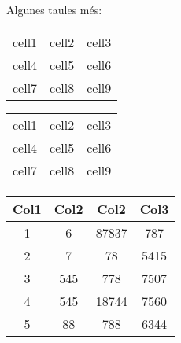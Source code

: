 %
%
%
Algunes taules més:
%
\begin{center}
\begin{tabular}{ c c c }
 cell1 & cell2 & cell3 \\ 
 cell4 & cell5 & cell6 \\  
 cell7 & cell8 & cell9    
\end{tabular}
\end{center}
%
\begin{center}
\begin{tabular}{ |c|c|c| } 
 \hline
 cell1 & cell2 & cell3 \\ 
 cell4 & cell5 & cell6 \\ 
 cell7 & cell8 & cell9 \\ 
 \hline
\end{tabular}
\end{center}

\begin{center}
 \begin{tabular}{||c c c c||} 
 \hline
 [0.5ex]  Col1 & Col2 & Col2 & Col3 \\ [0.5ex] 
 \hline\hline [0.5ex] 
 1 & 6 & 87837 & 787 \\ [0.5ex] 
 \hline [0.5ex] 
 2 & 7 & 78 & 5415 \\[0.5ex] 
 \hline
 3 & 545 & 778 & 7507 \\[0.5ex] 
 \hline
 4 & 545 & 18744 & 7560 \\[0.5ex] 
 \hline
 5 & 88 & 788 & 6344 \\ [0.5ex]  
 \hline
\end{tabular}
\end{center}

